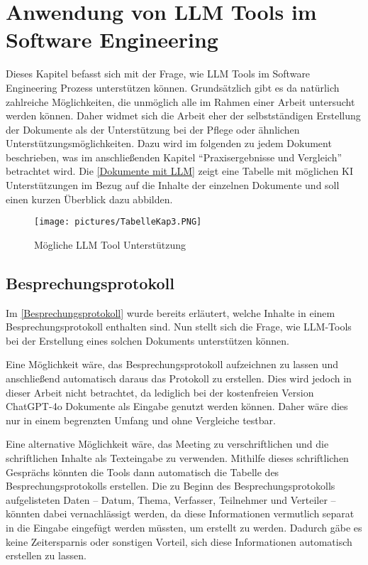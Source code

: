 \chapter{Anwendung von LLM Tools im Software Engineering} 

Dieses Kapitel befasst sich mit der Frage, wie LLM Tools im Software Engineering Prozess unterstützen können.
Grundsätzlich gibt es da natürlich zahlreiche Möglichkeiten, die unmöglich alle im Rahmen einer Arbeit untersucht 
werden können. Daher widmet sich die Arbeit eher der selbstständigen Erstellung der Dokumente als der Unterstützung bei 
der Pflege oder ähnlichen Unterstützungsmöglichkeiten. Dazu wird im folgenden zu jedem Dokument beschrieben,
was im anschließenden Kapitel ``Praxisergebnisse und Vergleich'' betrachtet wird. Die \autoref{Dokumente mit LLM}
zeigt eine Tabelle mit möglichen KI Unterstützungen im Bezug auf die Inhalte der einzelnen Dokumente und soll einen kurzen 
Überblick dazu abbilden.

\begin{figure}[H]
    \centering
    \texttt{[image: pictures/TabelleKap3.PNG]}
    \caption{Mögliche LLM Tool Unterstützung}
    \label{Dokumente mit LLM}
\end{figure}


\section{Besprechungsprotokoll}  \label{LLMBesprechungsprotokoll}

Im \autoref{Besprechungsprotokoll} wurde bereits erläutert, welche Inhalte in einem Besprechungsprotokoll enthalten 
sind. Nun stellt sich die Frage, wie LLM-Tools bei der Erstellung eines solchen Dokuments unterstützen können.

Eine Möglichkeit wäre, das Besprechungsprotokoll aufzeichnen zu lassen und anschließend automatisch daraus das 
Protokoll zu erstellen. Dies wird jedoch in dieser Arbeit nicht betrachtet, da lediglich bei der kostenfreien Version 
ChatGPT-4o Dokumente als Eingabe genutzt werden können. Daher wäre dies nur in einem begrenzten Umfang und ohne Vergleiche 
testbar.

Eine alternative Möglichkeit wäre, das Meeting zu verschriftlichen und die schriftlichen Inhalte als Texteingabe zu 
verwenden. Mithilfe dieses schriftlichen Gesprächs könnten die Tools dann automatisch die Tabelle des 
Besprechungsprotokolls erstellen. Die zu Beginn des Besprechungsprotokolls aufgelisteten Daten – Datum, Thema, 
Verfasser, Teilnehmer und Verteiler – könnten dabei vernachlässigt werden, da diese Informationen vermutlich separat 
in die Eingabe eingefügt werden müssten, um erstellt zu werden. Dadurch gäbe es keine Zeitersparnis oder sonstigen 
Vorteil, sich diese Informationen automatisch erstellen zu lassen.


